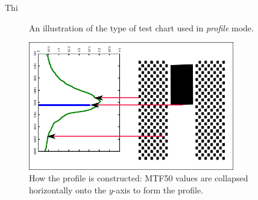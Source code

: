 \documentclass[a4paper]{article}
\begin{document}
Thi

\begin{figure}
\centering
{}
\caption{An illustration of the type of test chart used in \emph{profile}
mode.}
\label{fig:profile_test_chart}
\end{figure}

\begin{figure}
\centering
\includegraphics[width=0.8\textwidth]{figures/profile_construction}
\caption{How the profile is constructed: MTF50 values are collapsed
horizontally onto the $y$-axis to form the profile.}
\label{fig:profile_construction}
\end{figure}
\end{document}
